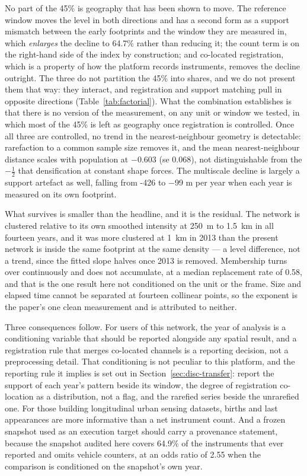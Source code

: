 \documentclass{article}
\newcommand{\rOwnHull}{64.7}
\newcommand{\covPct}{64.9}
\newcommand{\replMedian}{0.58}
\newcommand{\snapCondOR}{2.55}
\newcommand{\cleanSlopeLoc}{-0.603}
\newcommand{\cleanSELoc}{0.068}
\newcommand{\locHullDrop}{45}
\newcommand{\lKmExact}{-426}
\begin{document}
No part of the \locHullDrop\% is geography that has been shown to move. The
reference window moves the level in both directions and has a second form as a support mismatch
between the early footprints and the window they are measured in, which \emph{enlarges} the
decline to \rOwnHull\% rather than reducing it; the count term is on the
right-hand side of the index by construction; and co-located registration, which is a property of
how the platform records instruments, removes the decline outright. The three do not partition
the \locHullDrop\% into shares, and we do not present them that way: they interact, and
registration and support matching pull in opposite directions
(Table~\ref{tab:factorial}). What the combination establishes is that there is no version of the
measurement, on any unit or window we tested, in which most of the \locHullDrop\% is left as
geography once registration is controlled. Once all three are
controlled, no trend in the nearest-neighbour geometry is detectable: rarefaction to a common
sample size removes it, and the mean nearest-neighbour distance scales with population at
$\cleanSlopeLoc$ (se \cleanSELoc), not distinguishable from the $-\tfrac12$ that densification
at constant shape forces. The multiscale decline is largely a support artefact as well,
falling from \lKmExact{} to \num{-99} m per year when each year is measured on its own
footprint.

What survives is smaller than the headline, and it is the residual. The network is
clustered relative to its own smoothed intensity at \SI{250}{\meter} to \SI{1.5}{\kilo\meter} in
all fourteen years, and it was more clustered at \SI{1}{\kilo\meter} in 2013 than the present
network is inside the same footprint at the same density --- a level difference, not a
trend, since the fitted slope halves once 2013 is removed. Membership turns over continuously
and does not accumulate, at a median replacement rate of \replMedian{}, and that is the one
result here not conditioned on the unit or the frame. Size and elapsed time cannot be separated
at fourteen collinear points, so the exponent is the paper's one clean measurement and is
attributed to neither.

Three consequences follow. For users of this network, the year of analysis is a conditioning
variable that should be reported alongside any spatial result, and a registration rule that
merges co-located channels is a reporting decision, not a preprocessing detail. That
conditioning is not peculiar to this platform, and the reporting rule it implies is set out in
Section~\ref{sec:disc-transfer}: report the support of each year's pattern beside its window, the
degree of registration co-location as a distribution, not a flag, and the rarefied series
beside the unrarefied one. For those
building longitudinal urban sensing datasets, births and last appearances are more informative
than a net instrument count. And a frozen snapshot used as an execution target should carry a
provenance statement, because the snapshot audited here covers \covPct\% of the instruments that ever
reported and omits vehicle counters, at an odds ratio of \snapCondOR{} when the comparison is
conditioned on the snapshot's own year.
\end{document}
